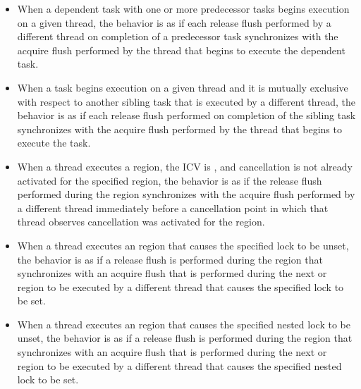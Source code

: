 \begin{itemize}
    \item When a dependent task with one or more predecessor tasks begins
        execution on a given thread, the behavior is as if each release flush
        performed by a different thread on completion of a predecessor task
        synchronizes with the acquire flush performed by the thread that
        begins to execute the dependent task.

    \item When a task begins execution on a given thread and it is mutually
        exclusive with respect to another sibling task that is executed by a
        different thread, the behavior is as if each release flush performed
        on completion of the sibling task synchronizes with the acquire flush
        performed by the thread that begins to execute the task.

    \item When a thread executes a  region, the 
        ICV is , and cancellation is not already activated for the
        specified region, the behavior is as if the release flush performed
        during the  region synchronizes with the acquire flush
        performed by a different thread immediately before a cancellation
        point in which that thread observes cancellation was activated for the
        region.

    \item When a thread executes an  region that causes the
	specified lock to be unset, the behavior is as if a release flush is
        performed during the  region that synchronizes
        with an acquire flush that is performed during the next
         or  region to be executed by a
        different thread that causes the specified lock to be set.

    \item When a thread executes an  region that causes
	the specified nested lock to be unset, the behavior is as if a release flush
        is performed during the  region that
        synchronizes with an acquire flush that is performed during the next
         or  region to be
        executed by a different thread that causes the specified nested lock
        to be set.  
\end{itemize}





